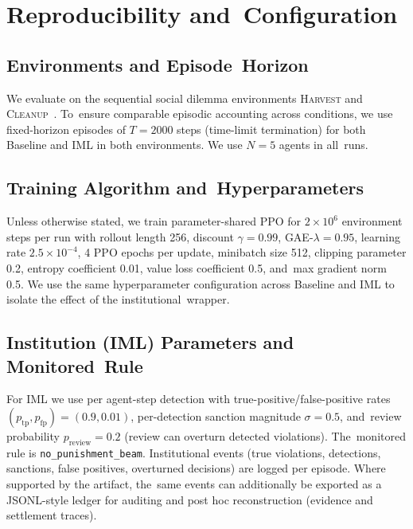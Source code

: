 \documentclass[mca,article,accept,pdftex,oneauthor]{Definitions/mdpi}
\begin{document}
\section{Reproducibility and~Configuration}
\label{app:repro}
\unskip


\subsection{Environments and Episode~Horizon}
We evaluate on the sequential social dilemma environments \textsc{Harvest} and \mbox{\textsc{Cleanup} \citep{Leibo2017SSD}.} To~ensure comparable episodic accounting across conditions, we use fixed-horizon episodes of $T=2000$ steps (time-limit termination) for both Baseline and IML in both environments. We use $N=5$ agents in all~runs.

\subsection{Training Algorithm and~Hyperparameters}
Unless otherwise stated, we train parameter-shared PPO for $2\times 10^6$ environment steps per run with rollout length 256, discount $\gamma=0.99$, GAE-$\lambda=0.95$, learning rate $2.5\times 10^{-4}$, 4 PPO epochs per update, minibatch size 512, clipping parameter 0.2, entropy coefficient 0.01, value loss coefficient 0.5, and~max gradient norm 0.5. We use the same hyperparameter configuration across Baseline and IML to isolate the effect of the institutional~wrapper.

\subsection{Institution (IML) Parameters and Monitored~Rule}
For IML we use per agent-step detection with true-positive/false-positive rates $(p_{\mathrm{tp}},p_{\mathrm{fp}})=(0.9,0.01)$, per-detection sanction magnitude $\sigma=0.5$, and~review probability $p_{\mathrm{review}}=0.2$ (review can overturn detected violations). The~monitored rule is \texttt{no\_punishment\_beam}. Institutional events (true violations, detections, sanctions, false positives, overturned decisions) are logged per episode. Where supported by the artifact, the~same events can additionally be exported as a JSONL-style ledger for auditing and post hoc reconstruction (evidence and settlement traces).
\end{document}
